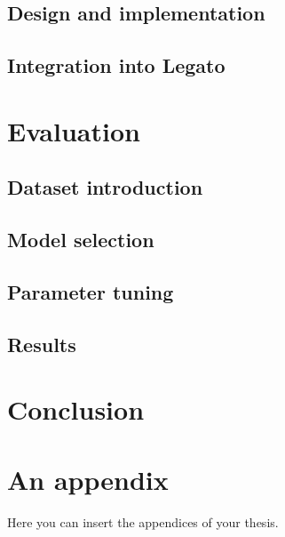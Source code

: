 \documentclass[
  digital, %
  table,   %
  lof,     %
  lot,     %
]{fithesis3}
\begin{document}
\section{Design and implementation}
\section{Integration into Legato}

\chapter{Evaluation}
\section{Dataset introduction}
\section{Model selection}
\section{Parameter tuning}
\section{Results}

\chapter{Conclusion}



  \printbibliography[heading=bibintoc] %

  \makeatletter\thesis@blocks@clear\makeatother
  \printindex

\appendix %
\chapter{An appendix}
Here you can insert the appendices of your thesis.
\end{document}
